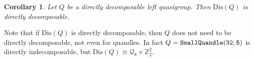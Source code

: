 \documentclass[a4paper, english, 9pt]{amsart}
\theoremstyle{plain}
\newtheorem{corollary}[theorem]{Corollary}
\theoremstyle{definition}
\def\dis{\mathrm{Dis}}
\def\Z{\mathbb Z}
\begin{document}
\begin{corollary}
    Let $Q$ be a directly decomposable left quasigroup. Then $\dis(Q)$ is directly decomposable.
\end{corollary}


Note that if $\dis(Q)$ is directly decomposable, then $Q$ does not need to be directly decomposable, not even for quandles. In fact $Q={\tt SmallQuandle(32,5)}$ is directly indecomposable, but $\dis(Q)\cong \mathcal{Q}_8\times \Z_2^2$. 
\end{document}
